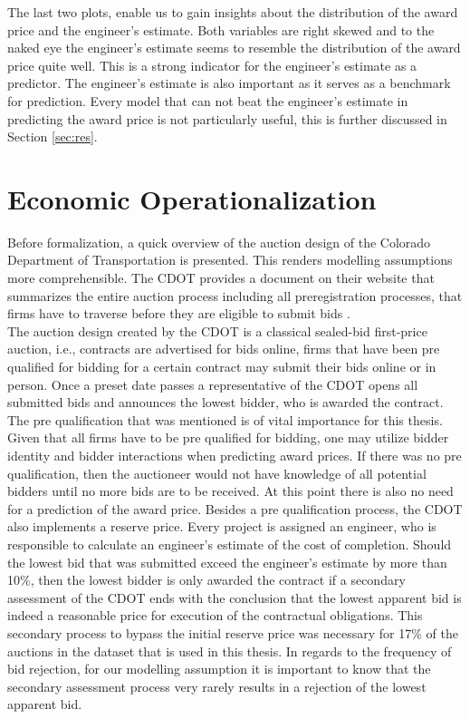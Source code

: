 \documentclass[a4paper,12pt, headsepline]{scrartcl}
\numberwithin{equation}{section}
\begin{document}
The last two plots, enable us to gain insights about the distribution of the award price and the engineer's estimate. Both variables are right skewed and to the naked eye the engineer's estimate seems to resemble the distribution of the award price quite well. This is a strong indicator for the engineer's estimate as a predictor. The engineer's estimate is also important as it serves as a benchmark for prediction. Every model that can not beat the engineer's estimate in predicting the award price is not particularly useful, this is further discussed in Section \ref{sec:res}.\\

\section{Economic Operationalization}\label{sec:op}

Before formalization, a quick overview of the auction design of the Colorado Department of Transportation is presented. This renders modelling assumptions more comprehensible. The CDOT provides a document on their website that summarizes the entire auction process including all preregistration processes, that firms have to traverse before they are eligible to submit bids \citep{CDOTRul}.\\
The auction design created by the CDOT is a classical sealed-bid first-price auction, i.e., contracts are advertised for bids online, firms that have been pre qualified for bidding for a certain contract may submit their bids online or in person. Once a preset date passes a representative of the CDOT opens all submitted bids and announces the lowest bidder, who is awarded the contract. The pre qualification that was mentioned is of vital importance for this thesis. Given that all firms have to be pre qualified for bidding, one may utilize bidder identity and bidder interactions when predicting award prices. If there was no pre qualification, then the auctioneer would not have knowledge of all potential bidders until no more bids are to be received. At this point there is also no need for a prediction of the award price. Besides a pre qualification process, the CDOT also implements a reserve price. Every project is assigned an engineer, who is responsible to calculate an engineer's estimate of the cost of completion. Should the lowest bid that was submitted exceed the engineer's estimate by more than 10\%, then the lowest bidder is only awarded the contract if a secondary assessment of the CDOT ends with the conclusion that the lowest apparent bid is indeed a reasonable price for execution of the contractual obligations. This secondary process to bypass the initial reserve price was necessary for 17\% of the auctions in the dataset that is used in this thesis. In regards to the frequency of bid rejection, for our modelling assumption it is important to know that the secondary assessment process very rarely results in a rejection of the lowest apparent bid. 
\end{document}
